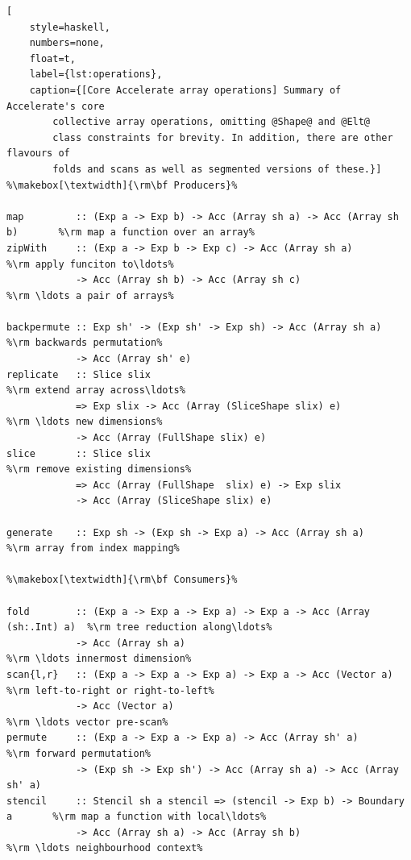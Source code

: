 \begin{lstlisting}[
    style=haskell,
    numbers=none,
    float=t,
    label={lst:operations},
    caption={[Core Accelerate array operations] Summary of Accelerate's core
        collective array operations, omitting @Shape@ and @Elt@
        class constraints for brevity. In addition, there are other flavours of
        folds and scans as well as segmented versions of these.}]
%\makebox[\textwidth]{\rm\bf Producers}%

map         :: (Exp a -> Exp b) -> Acc (Array sh a) -> Acc (Array sh b)       %\rm map a function over an array%
zipWith     :: (Exp a -> Exp b -> Exp c) -> Acc (Array sh a)                  %\rm apply funciton to\ldots%
            -> Acc (Array sh b) -> Acc (Array sh c)                           %\rm \ldots a pair of arrays%

backpermute :: Exp sh' -> (Exp sh' -> Exp sh) -> Acc (Array sh a)             %\rm backwards permutation%
            -> Acc (Array sh' e)
replicate   :: Slice slix                                                     %\rm extend array across\ldots%
            => Exp slix -> Acc (Array (SliceShape slix) e)                    %\rm \ldots new dimensions%
            -> Acc (Array (FullShape slix) e)
slice       :: Slice slix                                                     %\rm remove existing dimensions%
            => Acc (Array (FullShape  slix) e) -> Exp slix
            -> Acc (Array (SliceShape slix) e)

generate    :: Exp sh -> (Exp sh -> Exp a) -> Acc (Array sh a)                %\rm array from index mapping%

%\makebox[\textwidth]{\rm\bf Consumers}%

fold        :: (Exp a -> Exp a -> Exp a) -> Exp a -> Acc (Array (sh:.Int) a)  %\rm tree reduction along\ldots%
            -> Acc (Array sh a)                                               %\rm \ldots innermost dimension%
scan{l,r}   :: (Exp a -> Exp a -> Exp a) -> Exp a -> Acc (Vector a)           %\rm left-to-right or right-to-left%
            -> Acc (Vector a)                                                 %\rm \ldots vector pre-scan%
permute     :: (Exp a -> Exp a -> Exp a) -> Acc (Array sh' a)                 %\rm forward permutation%
            -> (Exp sh -> Exp sh') -> Acc (Array sh a) -> Acc (Array sh' a)
stencil     :: Stencil sh a stencil => (stencil -> Exp b) -> Boundary a       %\rm map a function with local\ldots%
            -> Acc (Array sh a) -> Acc (Array sh b)                           %\rm \ldots neighbourhood context%
\end{lstlisting}

